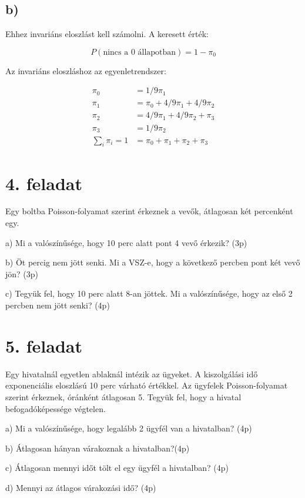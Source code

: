 \documentclass[a4paper,12pt]{article}
\begin{document}
\subsection*{b)}
Ehhez invariáns eloszlást kell számolni. A keresett érték:

\[P(\textrm{nincs a 0 állapotban}) = 1 - \pi_0\]

Az invariáns eloszláshoz az egyenletrendszer:

\begin{align*}
\pi_0 &= 1/9 \pi_1 \\
\pi_1 &= \pi_0 + 4/9 \pi_1 + 4/9 \pi_2 \\
\pi_2 &= 4/9 \pi_1 + 4/9 \pi_2 + \pi_3             \\
\pi_3 &= 1/9 \pi_2 \\
\sum_i \pi_i = 1 &= \pi_0 + \pi_1 + \pi_2 + \pi_3
\end{align*}

\section*{4. feladat}
Egy boltba Poisson-folyamat szerint érkeznek a vevők, átlagosan két 
percenként egy.

a)	Mi a valószínűsége, hogy 10 perc alatt pont 4 vevő érkezik? (3p)

b)	Öt percig nem jött senki. Mi a VSZ-e, hogy a következő percben 
pont két vevő jön? (3p)

c)	Tegyük fel, hogy 10 perc alatt 8-an jöttek. Mi a valószínűsége, 
hogy az első 2 percben nem jött senki? (4p)

\section*{5. feladat}
Egy hivatalnál egyetlen ablaknál intézik az ügyeket. A kiszolgálási 
idő exponenciális eloszlású 10 perc várható értékkel. Az ügyfelek 
Poisson-folyamat szerint érkeznek, óránként átlagosan 5. Tegyük fel, hogy 
a hivatal befogadóképessége végtelen.

a)	Mi a valószínűsége, hogy legalább 2 ügyfél van a hivatalban? (4p)

b)	Átlagosan hányan várakoznak a hivatalban?(4p)

c)	Átlagosan mennyi időt tölt el egy ügyfél a hivatalban? (4p)

d)	Mennyi az átlagos várakozási idő? (4p)
\end{document}
